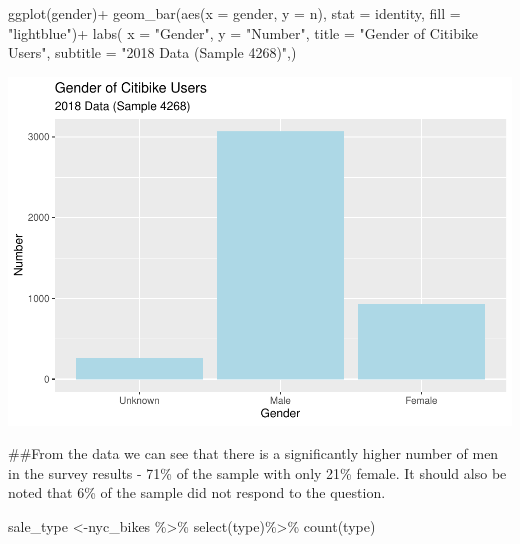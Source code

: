 \documentclass[
]{article}
\newenvironment{Shaded}{\begin{snugshade}}{\end{snugshade}}
\newcommand{\AttributeTok}[1]{\textcolor[rgb]{0.77,0.63,0.00}{#1}}
\newcommand{\FunctionTok}[1]{\textcolor[rgb]{0.00,0.00,0.00}{#1}}
\newcommand{\NormalTok}[1]{#1}
\newcommand{\OtherTok}[1]{\textcolor[rgb]{0.56,0.35,0.01}{#1}}
\newcommand{\SpecialCharTok}[1]{\textcolor[rgb]{0.00,0.00,0.00}{#1}}
\newcommand{\StringTok}[1]{\textcolor[rgb]{0.31,0.60,0.02}{#1}}
\begin{document}
\begin{Shaded}
\begin{Highlighting}[]
\FunctionTok{ggplot}\NormalTok{(gender)}\SpecialCharTok{+}
  \FunctionTok{geom\_bar}\NormalTok{(}\FunctionTok{aes}\NormalTok{(}\AttributeTok{x =}\NormalTok{ gender, }\AttributeTok{y =}\NormalTok{ n), }\AttributeTok{stat =} \StringTok{\textquotesingle{}identity\textquotesingle{}}\NormalTok{, }\AttributeTok{fill =} \StringTok{"lightblue"}\NormalTok{)}\SpecialCharTok{+}
 \FunctionTok{labs}\NormalTok{(}
    \AttributeTok{x =} \StringTok{"Gender"}\NormalTok{,}
    \AttributeTok{y =} \StringTok{"Number"}\NormalTok{,}
    \AttributeTok{title =} \StringTok{"Gender of Citibike Users"}\NormalTok{,}
    \AttributeTok{subtitle =} \StringTok{"2018 Data (Sample 4268)"}\NormalTok{,)}
\end{Highlighting}
\end{Shaded}

\includegraphics{nyc_bikes_presentation_janehogg_files/figure-latex/unnamed-chunk-4-1.pdf}

\#\#From the data we can see that there is a significantly higher number
of men in the survey results - 71\% of the sample with only 21\% female.
It should also be noted that 6\% of the sample did not respond to the
question.

\begin{Shaded}
\begin{Highlighting}[]
\NormalTok{sale\_type }\OtherTok{\textless{}{-}}\NormalTok{nyc\_bikes }\SpecialCharTok{\%\textgreater{}\%} 
  \FunctionTok{select}\NormalTok{(type)}\SpecialCharTok{\%\textgreater{}\%}
 \FunctionTok{count}\NormalTok{(type)}
\end{Highlighting}
\end{Shaded}
\end{document}
